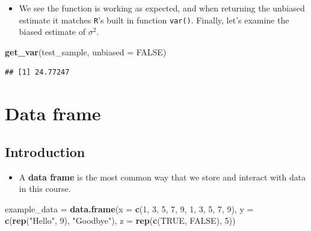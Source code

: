 \documentclass[]{book}
\newenvironment{Shaded}{\begin{snugshade}}{\end{snugshade}}
\newcommand{\KeywordTok}[1]{\textcolor[rgb]{0.13,0.29,0.53}{\textbf{#1}}}
\newcommand{\DataTypeTok}[1]{\textcolor[rgb]{0.13,0.29,0.53}{#1}}
\newcommand{\DecValTok}[1]{\textcolor[rgb]{0.00,0.00,0.81}{#1}}
\newcommand{\StringTok}[1]{\textcolor[rgb]{0.31,0.60,0.02}{#1}}
\newcommand{\OtherTok}[1]{\textcolor[rgb]{0.56,0.35,0.01}{#1}}
\newcommand{\NormalTok}[1]{#1}
\providecommand{\tightlist}{%
  \setlength{\itemsep}{0pt}\setlength{\parskip}{0pt}}
\begin{document}
\begin{itemize}
\tightlist
\item
  We see the function is working as expected, and when returning the
  unbiased estimate it matches \texttt{R}'s built in function
  \texttt{var()}. Finally, let's examine the biased estimate of
  \(\sigma^2\).
\end{itemize}

\begin{Shaded}
\begin{Highlighting}[]
\KeywordTok{get_var}\NormalTok{(test_sample, }\DataTypeTok{unbiased =} \OtherTok{FALSE}\NormalTok{)}
\end{Highlighting}
\end{Shaded}

\begin{verbatim}
## [1] 24.77247
\end{verbatim}

\chapter{Data frame}\label{data-frame}

\section{Introduction}\label{introduction}

\begin{itemize}
\tightlist
\item
  A \textbf{data frame} is the most common way that we store and
  interact with data in this course.
\end{itemize}

\begin{Shaded}
\begin{Highlighting}[]
\NormalTok{example_data =}\StringTok{ }\KeywordTok{data.frame}\NormalTok{(}\DataTypeTok{x =} \KeywordTok{c}\NormalTok{(}\DecValTok{1}\NormalTok{, }\DecValTok{3}\NormalTok{, }\DecValTok{5}\NormalTok{, }\DecValTok{7}\NormalTok{, }\DecValTok{9}\NormalTok{, }\DecValTok{1}\NormalTok{, }\DecValTok{3}\NormalTok{, }\DecValTok{5}\NormalTok{, }\DecValTok{7}\NormalTok{, }\DecValTok{9}\NormalTok{),}
                          \DataTypeTok{y =} \KeywordTok{c}\NormalTok{(}\KeywordTok{rep}\NormalTok{(}\StringTok{"Hello"}\NormalTok{, }\DecValTok{9}\NormalTok{), }\StringTok{"Goodbye"}\NormalTok{),}
                          \DataTypeTok{z =} \KeywordTok{rep}\NormalTok{(}\KeywordTok{c}\NormalTok{(}\OtherTok{TRUE}\NormalTok{, }\OtherTok{FALSE}\NormalTok{), }\DecValTok{5}\NormalTok{))}
\end{Highlighting}
\end{Shaded}
\end{document}
